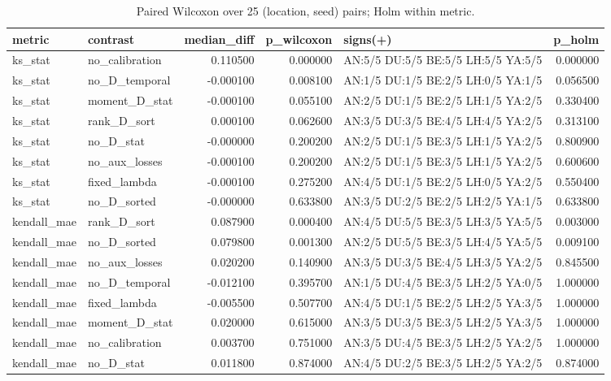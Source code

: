 \begin{table}
\caption{Paired Wilcoxon over 25 (location, seed) pairs; Holm within metric.}
\label{tab:wilcoxon}
\begin{tabular}{llrrlr}
\toprule
metric & contrast & median\_diff & p\_wilcoxon & signs(+) & p\_holm \\
\midrule
ks\_stat & no\_calibration & 0.110500 & 0.000000 & AN:5/5 DU:5/5 BE:5/5 LH:5/5 YA:5/5 & 0.000000 \\
ks\_stat & no\_D\_temporal & -0.000100 & 0.008100 & AN:1/5 DU:1/5 BE:2/5 LH:0/5 YA:1/5 & 0.056500 \\
ks\_stat & moment\_D\_stat & -0.000100 & 0.055100 & AN:2/5 DU:1/5 BE:2/5 LH:1/5 YA:2/5 & 0.330400 \\
ks\_stat & rank\_D\_sort & 0.000100 & 0.062600 & AN:3/5 DU:3/5 BE:4/5 LH:4/5 YA:2/5 & 0.313100 \\
ks\_stat & no\_D\_stat & -0.000000 & 0.200200 & AN:2/5 DU:1/5 BE:3/5 LH:1/5 YA:2/5 & 0.800900 \\
ks\_stat & no\_aux\_losses & -0.000100 & 0.200200 & AN:2/5 DU:1/5 BE:3/5 LH:1/5 YA:2/5 & 0.600600 \\
ks\_stat & fixed\_lambda & -0.000100 & 0.275200 & AN:4/5 DU:1/5 BE:2/5 LH:0/5 YA:2/5 & 0.550400 \\
ks\_stat & no\_D\_sorted & -0.000000 & 0.633800 & AN:3/5 DU:2/5 BE:2/5 LH:2/5 YA:1/5 & 0.633800 \\
kendall\_mae & rank\_D\_sort & 0.087900 & 0.000400 & AN:4/5 DU:5/5 BE:3/5 LH:3/5 YA:5/5 & 0.003000 \\
kendall\_mae & no\_D\_sorted & 0.079800 & 0.001300 & AN:2/5 DU:5/5 BE:3/5 LH:4/5 YA:5/5 & 0.009100 \\
kendall\_mae & no\_aux\_losses & 0.020200 & 0.140900 & AN:3/5 DU:3/5 BE:4/5 LH:3/5 YA:2/5 & 0.845500 \\
kendall\_mae & no\_D\_temporal & -0.012100 & 0.395700 & AN:1/5 DU:4/5 BE:3/5 LH:2/5 YA:0/5 & 1.000000 \\
kendall\_mae & fixed\_lambda & -0.005500 & 0.507700 & AN:4/5 DU:1/5 BE:2/5 LH:2/5 YA:3/5 & 1.000000 \\
kendall\_mae & moment\_D\_stat & 0.020000 & 0.615000 & AN:3/5 DU:3/5 BE:3/5 LH:2/5 YA:3/5 & 1.000000 \\
kendall\_mae & no\_calibration & 0.003700 & 0.751000 & AN:3/5 DU:4/5 BE:3/5 LH:2/5 YA:2/5 & 1.000000 \\
kendall\_mae & no\_D\_stat & 0.011800 & 0.874000 & AN:4/5 DU:2/5 BE:3/5 LH:2/5 YA:2/5 & 0.874000 \\

\end{tabular}
\end{table}
